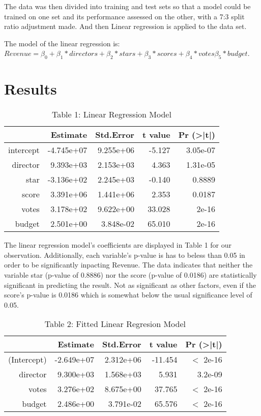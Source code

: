 \documentclass[12pt]{article}
\begin{document}
The data was then divided into training and test sets so that a model could be 
trained on one set and its performance assessed on the other, with a 7:3 split 
ratio adjustment made. And then Linear regression is applied to 
the data set.

The model of the linear regression is:
$Revenue = \beta_0 +\beta_1*directors + \beta_2*stars + \beta_3*scores + \beta_4*votes \beta_5*budget$.

\section{Results}
\label{sec:res}

\begin{table}[h]
\caption{Table 1: Linear Regression Model}
\centering
\begin{tabular}{rrrrr}
\hline
 & Estimate   & Std.Error & t value & Pr (\textgreater|t|) \\
 \hline
intercept & -4.745e+07 & 9.255e+06 & -5.127  & 3.05e-07 \\ 
director  & 9.393e+03  & 2.153e+03 & 4.363   & 1.31e-05 \\ 
star      & -3.136e+02 & 2.245e+03 & -0.140  & 0.8889 \\ 
score     & 3.391e+06  & 1.441e+06 & 2.353   & 0.0187 \\ 
votes     & 3.178e+02  & 9.622e+00 & 33.028  & 2e-16 \\ 
budget    & 2.501e+00  & 3.848e-02 & 65.010  & 2e-16 \\
\hline
\end{tabular}
\end{table}

The linear regression model's coefficients are displayed in Table 1 for our observation. 
Additionally, each variable's p-value is has to beless than 0.05 in order to be significantly
inpacting Revenue. The data indicates that neither the variable star (p-value of 0.8886) 
nor the score (p-value of 0.0186) are statistically significant in predicting the result.
Not as significant as other factors, even if the score's p-value is 0.0186 which is somewhat
below the usual significance level of 0.05. 

\begin{table}[h]
\caption{Table 2: Fitted Linear Regresion Model}
\centering
\begin{tabular}{rrrrr}
\hline
 & Estimate   & Std.Error & t value & Pr (\textgreater|t|) \\ 
\hline
(Intercept) & -2.649e+07 & 2.312e+06 & -11.454 & $<$ 2e-16 \\
director    & 9.300e+03  & 1.568e+03 & 5.931   & 3.2e-09 \\
votes       & 3.276e+02  & 8.675e+00 & 37.765  & $<$ 2e-16 \\
budget      & 2.486e+00  & 3.791e-02 & 65.576  & $<$ 2e-16 \\
\hline
\end{tabular}
\end{table}
\end{document}
